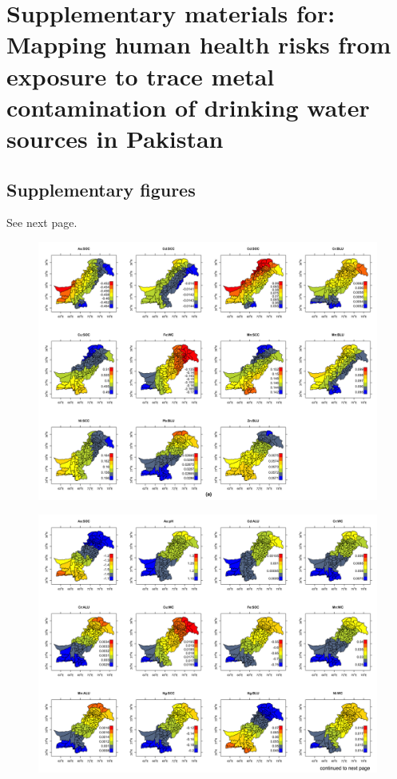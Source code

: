 \chapter{Supplementary materials for:\\Mapping human health risks from exposure to trace metal contamination of drinking water sources in Pakistan}
\label{appendixD}

\section{Supplementary figures}
\label{Supplementary figures}

See next page.

\begin{landscape}

\begin{figure}[hp!]
  \centering
  \vspace{-2cm} \includegraphics[width=\linewidth]{Figures/Fig_D_1_a.png}
  \label{Fig_D_1_a}
\end{figure}

\newpage

\begin{figure}[hp!]
  \centering
  \vspace{-0.5cm} \includegraphics[width=0.95\linewidth]{Figures/Fig_D_1_b_1.png}
  \label{Fig_D_1_b_1}
\end{figure}


\end{landscape}
